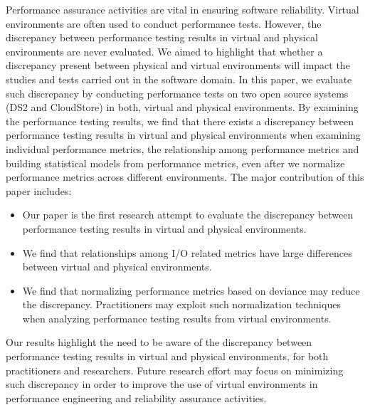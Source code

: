 \documentclass[smallextended]{svjour3}       %
\begin{document}
Performance assurance activities are vital in ensuring software reliability. Virtual environments are often used to conduct performance tests. However, the discrepancy between performance testing results in virtual and physical environments are never evaluated. We aimed to highlight that whether a discrepancy present between physical and virtual environments will impact the studies and tests carried out in the software domain. In this paper, we evaluate such discrepancy by conducting performance tests on two open source systems (DS2 and CloudStore) in both, virtual and physical environments. By examining the performance testing results, we find that there exists a discrepancy between performance testing results in virtual and physical environments when examining individual performance metrics, the relationship among performance metrics and building statistical models from performance metrics, even after we normalize performance metrics across different environments. The major contribution of this paper includes: 
\begin{itemize} \itemsep -0.4pt 
	\item Our paper is the first research attempt to evaluate the discrepancy between performance testing results in virtual and physical environments.
	\item We find that relationships among I/O related metrics have large differences between virtual and physical environments.
	\item We find that normalizing performance metrics based on deviance may reduce the discrepancy. Practitioners may exploit such normalization techniques when analyzing performance testing results from virtual environments.
\end{itemize}
Our results highlight the need to be aware of the discrepancy between performance testing results in virtual and physical environments, for both practitioners and researchers. Future research effort may focus on minimizing such discrepancy in order to improve the use of virtual environments in performance engineering and reliability assurance activities.





\end{document}
